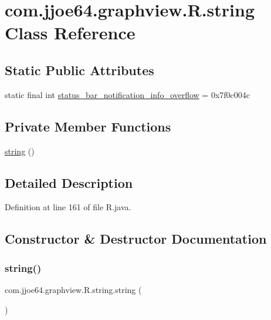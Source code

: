 \hypertarget{classcom_1_1jjoe64_1_1graphview_1_1_r_1_1string}{}\section{com.\+jjoe64.\+graphview.\+R.\+string Class Reference}
\label{classcom_1_1jjoe64_1_1graphview_1_1_r_1_1string}
\subsection*{Static Public Attributes}
\begin{DoxyCompactItemize}
\item 
static final int \mbox{\hyperlink{classcom_1_1jjoe64_1_1graphview_1_1_r_1_1string_a7d583396aeb69569c8304e0e68da8c43}{status\+\_\+bar\+\_\+notification\+\_\+info\+\_\+overflow}} = 0x7f0c004c
\end{DoxyCompactItemize}
\subsection*{Private Member Functions}
\begin{DoxyCompactItemize}
\item 
\mbox{\hyperlink{classcom_1_1jjoe64_1_1graphview_1_1_r_1_1string_a8f78ebc11cabc1325aff3aff7733a185}{string}} ()
\end{DoxyCompactItemize}


\subsection{Detailed Description}


Definition at line 161 of file R.\+java.



\subsection{Constructor \& Destructor Documentation}
\mbox{\label{classcom_1_1jjoe64_1_1graphview_1_1_r_1_1string_a8f78ebc11cabc1325aff3aff7733a185}} 
\subsubsection{\texorpdfstring{string()}{string()}}
{\footnotesize\ttfamily com.\+jjoe64.\+graphview.\+R.\+string.\+string (\begin{DoxyParamCaption}{ }\end{DoxyParamCaption})\hspace{0.3cm}{\ttfamily [private]}}



